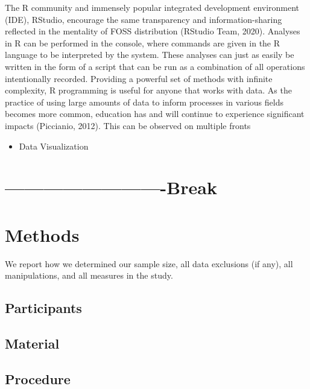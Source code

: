 \documentclass[english,man,floatsintext]{apa6}
\providecommand{\tightlist}{%
  \setlength{\itemsep}{0pt}\setlength{\parskip}{0pt}}
\begin{document}
The R community and immensely popular integrated development environment (IDE), RStudio, encourage the same transparency and information-sharing reflected in the mentality of FOSS distribution (RStudio Team, 2020). Analyses in R can be performed in the console, where commands are given in the R language to be interpreted by the system. These analyses can just as easily be written in the form of a script that can be run as a combination of all operations intentionally recorded. Providing a powerful set of methods with infinite complexity, R programming is useful for anyone that works with data. As the practice of using large amounts of data to inform processes in various fields becomes more common, education has and will continue to experience significant impacts (Piccianio, 2012). This can be observed on multiple fronts

\begin{itemize}
\tightlist
\item
  Data Visualization
\end{itemize}

\hypertarget{break}{%
\section{-------------------------Break}\label{break}}

\hypertarget{methods}{%
\section{Methods}\label{methods}}

We report how we determined our sample size, all data exclusions (if any), all manipulations, and all measures in the study.

\hypertarget{participants}{%
\subsection{Participants}\label{participants}}

\hypertarget{material}{%
\subsection{Material}\label{material}}

\hypertarget{procedure}{%
\subsection{Procedure}\label{procedure}}
\end{document}
